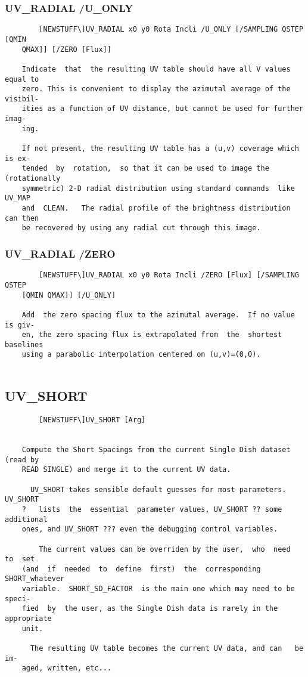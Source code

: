 \subsubsection{UV\_RADIAL /U\_ONLY}
\begin{verbatim}
        [NEWSTUFF\]UV_RADIAL x0 y0 Rota Incli /U_ONLY [/SAMPLING QSTEP [QMIN
    QMAX]] [/ZERO [Flux]]

    Indicate  that  the resulting UV table should have all V values equal to
    zero. This is convenient to display the azimutal average of the visibil-
    ities as a function of UV distance, but cannot be used for further imag-
    ing.

    If not present, the resulting UV table has a (u,v) coverage which is ex-
    tended  by  rotation,  so that it can be used to image the (rotationally
    symmetric) 2-D radial distribution using standard commands  like  UV_MAP
    and  CLEAN.   The radial profile of the brightness distribution can then
    be recovered by using any radial cut through this image.

\end{verbatim}
\subsubsection{UV\_RADIAL /ZERO}
\begin{verbatim}
        [NEWSTUFF\]UV_RADIAL x0 y0 Rota Incli /ZERO [Flux] [/SAMPLING  QSTEP
    [QMIN QMAX]] [/U_ONLY]

    Add  the zero spacing flux to the azimutal average.  If no value is giv-
    en, the zero spacing flux is extrapolated from  the  shortest  baselines
    using a parabolic interpolation centered on (u,v)=(0,0).


\end{verbatim}
\subsection{UV\_SHORT}
\begin{verbatim}
        [NEWSTUFF\]UV_SHORT [Arg]


    Compute the Short Spacings from the current Single Dish dataset (read by
    READ SINGLE) and merge it to the current UV data.

      UV_SHORT takes sensible default guesses for most parameters.  UV_SHORT
    ?   lists  the  essential  parameter values, UV_SHORT ?? some additional
    ones, and UV_SHORT ??? even the debugging control variables.

        The current values can be overriden by the user,  who  need  to  set
    (and  if  needed  to  define  first)  the  corresponding  SHORT_whatever
    variable.  SHORT_SD_FACTOR  is the main one which may need to be  speci-
    fied  by  the user, as the Single Dish data is rarely in the appropriate
    unit.

      The resulting UV table becomes the current UV data, and can   be   im-
    aged, written, etc...

\end{verbatim}
